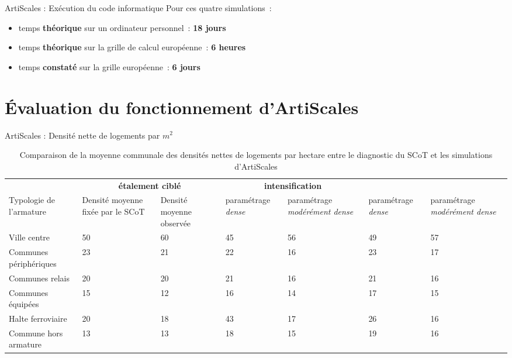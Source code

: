 \documentclass[xcolor=table]{beamer}
\begin{document}
\begin{frame}{ArtiScales : Exécution du code informatique}
Pour ces quatre simulations~:
	\begin{itemize}
		\item temps \textbf{théorique} sur un ordinateur personnel~: \textbf{18 jours}
		\item temps \textbf{théorique} sur la grille de calcul européenne~: \textbf{6 heures}
		\item temps \textbf{constaté} sur la grille européenne~: \textbf{6 jours}
	\end{itemize}
\end{frame}

\section{Évaluation du fonctionnement d'ArtiScales}

\begin{frame}{ArtiScales : Densité nette de logements par $m^{2}$}
\begin{table}[h]
	{\footnotesize \caption{Comparaison de la moyenne communale des densités nettes de logements par hectare entre le diagnostic du SCoT et les simulations d'ArtiScales}}	
	\tiny 
	\begin{center}
		\begin{tabular}{m{2.4cm}m{1.2cm}m{0.9cm}m{1cm}m{1cm}m{1cm}m{1cm}}
			\rowcolor[gray]{0.8}
			\multicolumn{3}{c}{Densité moyenne simulée pour le scénario~:}&\multicolumn{2}{c}{\textbf{étalement ciblé}} &\multicolumn{2}{c}{\textbf{intensification}}\\
			
			\rowcolor[gray]{0.9}
			Typologie de l'armature &
			Densité moyenne fixée par le SCoT &
			Densité moyenne observée&
			\cellcolor[gray]{0.8}paramétrage \textit{dense} & \cellcolor[gray]{0.8}paramétrage \textit{modérément dense}& \cellcolor[gray]{0.8}paramétrage \textit{dense} & \cellcolor[gray]{0.8}paramétrage \textit{modérément dense} \\ \hline
			
			Ville centre&50&60&45&56&49&57\\ \hline
			\rowcolor[gray]{0.9}Communes périphériques&23&21&22&16&23&17\\ \hline
			Communes relais &20&20&21&16&21&16\\ \hline
			\rowcolor[gray]{0.9}Communes équipées&15&12&16&14&17&15\\ \hline
			Halte ferroviaire&20&18&43&17&26&16 \\ \hline
			\rowcolor[gray]{0.9}Commune hors armature&13&13&18&15&19&16
			\\ \hline
		\end{tabular}
	\end{center}
\end{table}
\end{frame}
\end{document}
